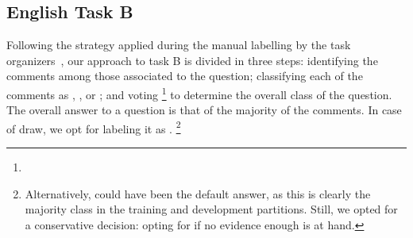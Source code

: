 % 
% 
% 
% 
% 



\subsection{English Task B}
\label{sub:app_enB}

Following the strategy applied during the manual labelling by the task 
organizers~, our approach to task B is divided in three steps:
\Ni identifying the \good comments among those associated to the question;
\Nii classifying each of the \good comments as \yes, \no, or \unsure; and 
\Niii voting%
\footnote{} to determine 
the overall class of the question. The overall answer to a question is that of 
the majority of the comments. In case of draw, we opt for labeling it as 
\unsure.%
\footnote{Alternatively, \yes could have been the default answer, as this is 
clearly the majority class in the training and development partitions. Still, 
we opted for a conservative decision: opting for \unsure if no evidence enough 
is at hand.}

